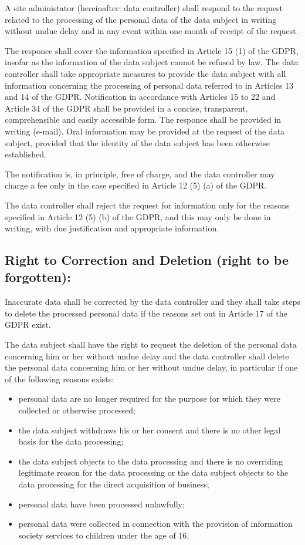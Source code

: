 \documentclass[11pt]{article}
\begin{document}
A site administator (hereinafter: data controller) shall respond to the request related to the processing of the personal data of the data subject in writing without undue delay and in any event within one month of receipt of the request.

The responce shall cover the information specified in Article 15 (1) of the GDPR, insofar as the information of the data subject cannot be refused by law. The data controller shall take appropriate measures to provide the data subject with all information concerning the processing of personal data referred to in Articles 13 and 14 of the GDPR. Notification in accordance with Articles 15 to 22 and Article 34 of the GDPR shall be provided in a concise, transparent, comprehensible and easily accessible form. The responce shall be provided in writing (e-mail). Oral information may be provided at the request of the data subject, provided that the identity of the data subject has been otherwise established.

The notification is, in principle, free of charge, and the data controller may charge a fee only in the case specified in Article 12 (5) (a) of the GDPR.

The data controller shall reject the request for information only for the reasons specified in Article 12 (5) (b) of the GDPR, and this may only be done in writing, with due justification and appropriate information.

\subsection{Right to Correction and Deletion (right to be forgotten):}
Inaccurate data shall be corrected by the data controller and they shall take steps to delete the processed personal data if the reasons set out in Article 17 of the GDPR exist.

The data subject shall have the right to request the deletion of the personal data concerning him or her without undue delay and the data controller shall delete the personal data concerning him or her without undue delay, in particular if one of the following reasons exists:

\begin{itemize}
    \item personal data are no longer required for the purpose for which they were collected or otherwise processed;
    \item the data subject withdraws his or her consent and there is no other legal basis for the data processing;
    \item the data subject objects to the data processing and there is no overriding legitimate reason for the data processing or the data subject objects to the data processing for the direct acquisition of business;
    \item personal data have been processed unlawfully;
    \item personal data were collected in connection with the provision of information society services to children under the age of 16.
\end{itemize}
\end{document}
